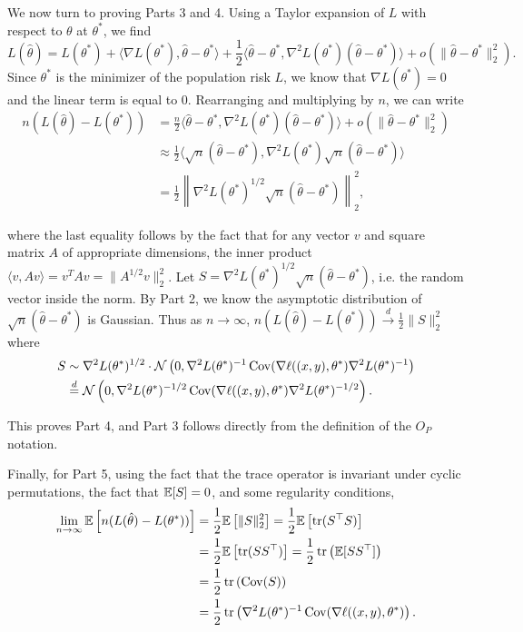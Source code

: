 We now turn to proving Parts 3 and 4. Using a Taylor expansion of $L$ with respect to $\theta$ at $\theta^*$, we find
\begin{equation}
L(\hat \theta) = L(\theta^*) 
+ \langle \nabla L(\theta^*), \hat \theta - \theta^* \rangle 
+ \frac12 \langle \hat \theta - \theta^*, \nabla^2 L(\theta^*) (\hat \theta - \theta^*) \rangle + o(\|\hat \theta - \theta^*\|_2^2).
\end{equation}
Since $\theta^*$ is the minimizer of the population risk $L$, we know that $\nabla L(\theta^*) = 0$ and the linear term is equal to 0. Rearranging and multiplying by $n$, we can write
\begin{align}
n (L(\hat \theta) - L(\theta^*)) &= \frac{n}{2} \langle \hat \theta - \theta^*, \nabla^2 L(\theta^*) (\hat \theta - \theta^*) \rangle + o(\|\hat \theta - \theta^*\|_2^2) \\
&\approx \frac12 \langle \sqrt n(\hat \theta - \theta^*), \nabla^2 L(\theta^*) \sqrt n (\hat \theta - \theta^*) \rangle \\
&= \frac12 \left\|\nabla^2 L(\theta^*)^{1/2} \sqrt n(\hat \theta - \theta^*) \right\|_2^2,
\end{align}

where the last equality follows by the fact that for any vector $v$ and square matrix $A$ of appropriate dimensions, the inner product $\langle v, Av\rangle = v^T Av = \lVert A^{1/2}v \rVert_2^2$. Let $S = \nabla^2 L(\theta^*)^{1/2} \sqrt n(\hat \theta - \theta^*)$, i.e. the random vector inside the norm. By Part 2, we know the asymptotic distribution of $\sqrt n(\hat \theta - \theta^*)$ is Gaussian. Thus as $n \to \infty$, $n (L(\hat \theta) - L(\theta^*)) \overset d \to \frac12 \|S\|_2^2$ where
\begin{align}
    S &\sim \nabla^2 L(\theta^*)^{1/2} \cdot \mathcal N \left(0, \nabla^2 L(\theta^*)^{-1} \operatorname{Cov}(\nabla \ell ((x, y), \theta^*) \nabla^2 L(\theta^*)^{-1} \right) \\
    &\stackrel{d}{=} \mathcal N \left(0, \nabla^2 L(\theta^*)^{-1/2} \operatorname{Cov}(\nabla \ell ((x, y), \theta^*) \nabla^2 L(\theta^*)^{-1/2} \right).
\end{align}

This proves Part 4, and Part 3 follows directly from the definition of the $O_P$ notation.

Finally, for Part 5, using the fact that the trace operator is invariant under cyclic permutations, the fact that $\mathbb{E} [S] = 0$, and some regularity conditions,
\begin{align}
    \lim_{n \to \infty} \mathbb{E} \left[ n (L(\hat \theta) - L(\theta^*)) \right] &= \frac12 \mathbb{E}\left[ \|S\|_2^2 \right] = \frac12 \mathbb{E} \left[ \operatorname{tr}(S^\top S) \right] \\
    &= \frac12 \mathbb{E} \left[ \operatorname{tr}(S S^\top) \right]  = \frac12 \operatorname{tr} \left(\mathbb{E}[S S^\top] \right) \\
    &= \frac12 \operatorname{tr} \left( \operatorname{Cov}(S) \right) \\
    &= \frac12 \operatorname{tr}\left( \nabla^2 L(\theta^*)^{-1} \operatorname{Cov}(\nabla \ell ((x, y), \theta^*) \right).
\end{align}

